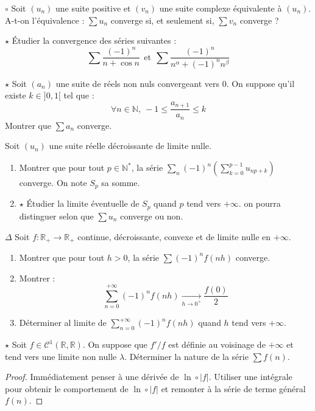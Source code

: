 \documentclass[french,a4paper]{article}
\newcommand{\N}{\mathbb{N}}
\newcommand{\R}{\mathbb{R}}
\newcommand{\st}{^*}
\theoremstyle{plain}
\theoremstyle{definition}
\theoremstyle{remark}
\begin{document}
\begin{ex}{$\circ$}
	Soit $(u_n)$ une suite positive et $(v_n)$ une suite complexe équivalente à $(u_n)$. A-t-on l'équivalence : $\displaystyle\sum u_n$ converge si, et seulement si, $\displaystyle\sum v_n$ converge ?
\end{ex}

\begin{ex}{$\star$}
	Étudier la convergence des séries suivantes :
	$$\sum\frac{(-1)^n}{n+\cos n}\ \ \text{et}\ \ \sum\frac{(-1)^n}{n^\alpha+(-1)^nn^\beta}$$
\end{ex}

\begin{ex}{$\star$}
	Soit $(a_n)$ une suite de réels non nuls convergeant vers $0$. On suppose qu'il existe $k\in]0,1[$ tel que : $$\forall n\in\N,\ -1\leqslant\frac{a_{n+1}}{a_n}\leqslant k$$ Montrer que $\sum a_n$ converge.
\end{ex}

\begin{ex}{}
	Soit $(u_n)$ une suite réelle décroissante de limite nulle.
	\begin{enumerate}
		\item Montrer que pour tout $p\in\N\st$, la série $\displaystyle\sum_n(-1)^n\left(\sum_{k=0}^{p-1}u_{np+k}\right)$ converge. On note $S_p$ sa somme.
		\item $\star$ Étudier la limite éventuelle de $S_p$ quand $p$ tend vers $+\infty$. on pourra distinguer selon que $\sum u_n$ converge ou non.
	\end{enumerate}
\end{ex}

\begin{ex}{$\Delta$}
	Soit $f:\R_+\to\R_+$ continue, décroissante, convexe et de limite nulle en $+\infty$.
	\begin{enumerate}
		\item Montrer que pour tout $h>0$, la série $\displaystyle\sum (-1)^nf(nh)$ converge.
		\item Montrer : $$\sum_{n=0}^{+\infty}(-1)^nf(nh)\xrightarrow[h\to 0^+]{}\frac{f(0)}{2}$$
		\item Déterminer al limite de $\displaystyle\sum_{n=0}^{+\infty}(-1)^nf(nh)$ quand $h$ tend vers $+\infty$.
	\end{enumerate}
\end{ex}

\begin{ex}{$\star$}
	Soit $f\in\mathcal{C}^1(\R,\R)$. On suppose que $f'/f$ est définie au voisinage de $+\infty$ et tend vers une limite non nulle $\lambda$. Déterminer la nature de la série $\sum f(n)$.
\end{ex}
\begin{proof}
	Immédiatement penser à une dérivée de $\ln\circ \lvert f\rvert$. Utiliser une intégrale pour obtenir le comportement de $\ln\circ\lvert f\rvert$ et remonter à la série de terme général $f(n)$.
\end{proof}
\end{document}
